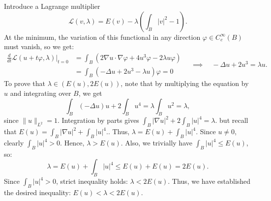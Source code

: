 \documentclass{lkx_pset}
\begin{document}
\begin{parts}
	Introduce a Lagrange multiplier
	\[
		\mathcal{L}(v,\lambda) = E(v) - \lambda \left(\int_B |v|^2 - 1\right).
	\]
	At the minimum, the variation of this functional in any direction $\varphi \in C_c^\infty(B)$ must vanish, so we get:
	\[
		\begin{aligned}
			\frac{d}{dt}\mathcal{L}(u+t\varphi,\lambda)\Big|_{t=0}
			 & = \int_B (2\nabla u \cdot \nabla \varphi + 4u^3\varphi - 2\lambda u\varphi) \\
			 & = \int_B(-\Delta u+2u^3-\lambda u)\varphi=0
		\end{aligned}
		\quad\implies\quad
		-\Delta u + 2u^3 = \lambda u.
	\]
	To prove that $\lambda\in (E(u), 2E(u))$, note that by
	multiplying the equation by $u$ and integrating over $B$, we get
	\[
		\int_B(-\Delta u)u+2\int_Bu^4=\lambda\int_B u^2=\lambda,
	\]
	since $\|u\|_{L^2}=1$. Integration by parts gives
	$
		\int_B|\nabla u|^2+2\int_B|u|^4=\lambda.
	$
	but recall that
	$
		E(u)=\int_B|\nabla u|^2+\int_B|u|^4.
	$.
	Thus,
	$
		\lambda=E(u)+\int_B|u|^4.
	$
	Since $u\neq 0$, clearly $\int_B|u|^4>0$. Hence,
	$
		\lambda>E(u).
	$
	Also, we trivially have $\int_B|u|^4\leq E(u)$, so:
	\[
		\lambda=E(u)+\int_B|u|^4\leq E(u)+E(u)=2E(u).
	\]
	Since $\int_B|u|^4>0$, strict inequality holds:
	$
		\lambda<2E(u).
	$
	Thus, we have established the desired inequality:
	$
		E(u)<\lambda<2E(u).
	$
\end{parts}
\end{document}
